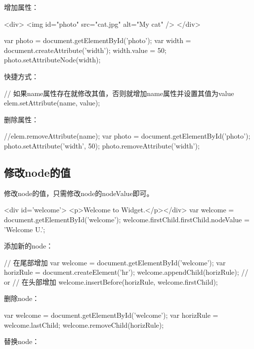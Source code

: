 \documentclass[a4paper,11pt]{article}
\begin{document}
增加属性：

\begin{javascriptcode}
  <div>
    <img id="photo" src="cat.jpg" alt="My cat" />
  </div>

  var photo = document.getElementById('photo');
  var width = document.createAttribute('width');
  width.value = 50;
  photo.setAttributeNode(width);
\end{javascriptcode}

快捷方式：

\begin{javascriptcode}
  // 如果name属性存在就修改其值，否则就增加name属性并设置其值为value
  elem.setAttribute(name, value);
\end{javascriptcode}

删除属性：

\begin{javascriptcode}
  //elem.removeAttribute(name);
  var photo = document.getElementById('photo');
  photo.setAttribute('width', 50);
  photo.removeAttribute('width');
\end{javascriptcode}


\subsection[修改node的值]{修改node的值}
修改node的值，只需修改node的nodeValue即可。

\begin{javascriptcode}
  <div id='welcome'> <p>Welcome to Widget.</p></div>
  var welcome = document.getElementById('welcome');
  welcome.firstChild.firstChild.nodeValue = 'Welcome U.';
\end{javascriptcode}

添加新的node：

\begin{javascriptcode}
  // 在尾部增加
  var welcome = document.getElementById('welcome');
  var horizRule = document.createElement('hr');
  welcome.appendChild(horizRule);
  // or
  // 在头部增加
  welcome.insertBefore(horizRule, welcome.firstChild);
\end{javascriptcode}

删除node：

\begin{javascriptcode}
  var welcome = document.getElementById('welcome');
  var horizRule = welcome.lastChild;
  welcome.removeChild(horizRule);
\end{javascriptcode}

替换node：
\end{document}
